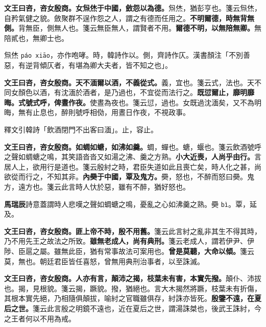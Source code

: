 \textbf{文王曰咨，咨女殷商。女炰烋于中國，斂怨以為德。}{\footnotesize 炰烋，猶彭亨也。箋云炰烋，自矜氣健之貌。斂聚群不逞作怨之人，謂之有德而任用之。}\textbf{不明爾德，時無背無側。}{\footnotesize 背無臣，側無人也。箋云無臣無人，謂賢者不用。}\textbf{爾德不明，以無陪無卿。}{\footnotesize 無陪貳也，無卿士也。}

\begin{quoting}炰烋 \texttt{páo xiāo}，亦作咆哮。時，韓詩作以。側，齊詩作仄。漢書顏注「不別善惡，有逆背傾仄者，有堪為卿大夫者，皆不知之也」。\end{quoting}

\textbf{文王曰咨，咨女殷商。天不湎爾以酒，不義從式。}{\footnotesize 義，宜也。箋云式，法也。天不同女顏色以酒，有沈湎於酒者，是乃過也，不宜從而法行之。}\textbf{既愆爾止，靡明靡晦。式號式呼，俾晝作夜。}{\footnotesize 使晝為夜也。箋云愆，過也。女既過沈湎矣，又不為明晦，無有止息也，醉則號呼相俲，用晝日作夜，不視政事。}

\begin{quoting}釋文引韓詩「飲酒閉門不出客曰湎」。止，容止。\end{quoting}

\textbf{文王曰咨，咨女殷商。如蜩如螗，如沸如羹。}{\footnotesize 蜩，蟬也。螗，蝘也。箋云飲酒號呼之聲如蜩螗之鳴，其笑語沓沓又如湯之沸、羹之方熟。}\textbf{小大近喪，人尚乎由行。}{\footnotesize 言居人上，欲用行是道也。箋云殷紂之時，君臣失道如此且喪亡矣，時人化之甚，尚欲從而行之，不知其非。}\textbf{內奰于中國，覃及鬼方。}{\footnotesize 奰，怒也，不醉而怒曰奰。鬼方，遠方也。箋云此言時人忕於惡，雖有不醉，猶好怒也。}

\begin{quoting}\textbf{馬瑞辰}詩意蓋謂時人悲嘆之聲如蜩螗之鳴，憂亂之心如沸羹之熟。奰 \texttt{bì}。覃，延及。\end{quoting}

\textbf{文王曰咨，咨女殷商。匪上帝不時，殷不用舊。}{\footnotesize 箋云此言紂之亂非其生不得其時，乃不用先王之故法之所致。}\textbf{雖無老成人，尚有典刑。}{\footnotesize 箋云老成人，謂若伊尹、伊陟、臣扈之屬。雖無此臣，猶有常事故法可案用也。}\textbf{曾是莫聽，大命以傾。}{\footnotesize 箋云莫，無也。朝廷君臣皆任喜怒，曾無用典刑治事者，以至誅滅。}

\textbf{文王曰咨，咨女殷商。人亦有言，顛沛之揭，枝葉未有害，本實先撥。}{\footnotesize 顛仆、沛拔也。揭，見根貌。箋云揭，蹶貌。撥，猶絕也。言大木揭然將蹶，枝葉未有折傷，其根本實先絕，乃相隨俱顛拔，喻紂之官職雖俱存，紂誅亦皆死。}\textbf{殷鑒不遠，在夏后之世。}{\footnotesize 箋云此言殷之明鏡不遠也，近在夏后之世，謂湯誅桀也，後武王誅紂，今之王者何以不用為戒。}

